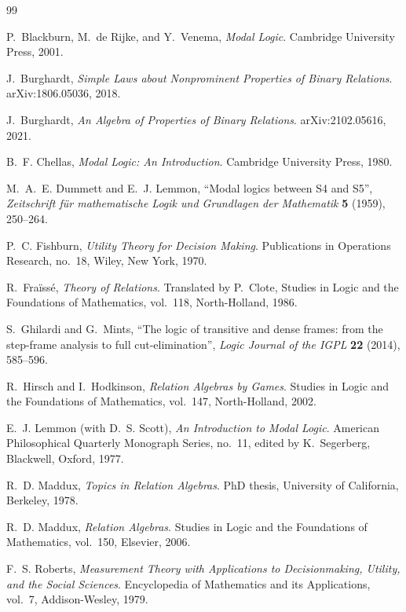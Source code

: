 \documentclass[11pt,a4paper,reqno]{amsart}
\theoremstyle{definition}
\theoremstyle{remark}
\begin{document}
\begin{thebibliography}{99}

P.~Blackburn, M.~de Rijke, and Y.~Venema,
\textit{Modal Logic}.
Cambridge University Press, 2001.

J.~Burghardt,
\textit{Simple Laws about Nonprominent Properties of Binary Relations}.
arXiv:1806.05036, 2018.

J.~Burghardt,
\textit{An Algebra of Properties of Binary Relations}.
arXiv:2102.05616, 2021.

B.~F. Chellas,
\textit{Modal Logic: An Introduction}.
Cambridge University Press, 1980.

M.~A.~E. Dummett and E.~J. Lemmon,
``Modal logics between S4 and S5'',
\textit{Zeitschrift f\"ur mathematische Logik und Grundlagen der Mathematik}
\textbf{5} (1959), 250--264.

P.~C. Fishburn,
\textit{Utility Theory for Decision Making}.
Publications in Operations Research, no.~18, Wiley, New York, 1970.

R.~Fra\"iss\'e,
\textit{Theory of Relations}.
Translated by P.~Clote, Studies in Logic and the Foundations of Mathematics,
vol.~118, North-Holland, 1986.

S.~Ghilardi and G.~Mints,
``The logic of transitive and dense frames: from the step-frame analysis to
full cut-elimination'',
\textit{Logic Journal of the IGPL} \textbf{22} (2014), 585--596.

R.~Hirsch and I.~Hodkinson,
\textit{Relation Algebras by Games}.
Studies in Logic and the Foundations of Mathematics, vol.~147,
North-Holland, 2002.

E.~J. Lemmon (with D.~S. Scott),
\textit{An Introduction to Modal Logic}.
American Philosophical Quarterly Monograph Series, no.~11,
edited by K.~Segerberg, Blackwell, Oxford, 1977.

R.~D. Maddux,
\textit{Topics in Relation Algebras}.
PhD thesis, University of California, Berkeley, 1978.

R.~D. Maddux,
\textit{Relation Algebras}.
Studies in Logic and the Foundations of Mathematics, vol.~150,
Elsevier, 2006.

F.~S. Roberts,
\textit{Measurement Theory with Applications to Decisionmaking, Utility, and
the Social Sciences}.
Encyclopedia of Mathematics and its Applications, vol.~7,
Addison-Wesley, 1979.


\end{thebibliography}
\end{document}
